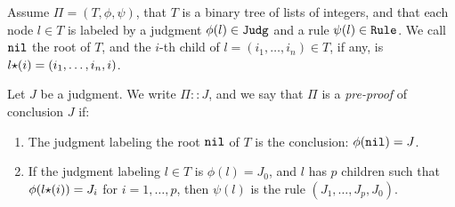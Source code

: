 

\begin{definition}
Assume $\Pi=(T,\phi, \psi)$, that $T$ is a binary tree of lists of integers, and 
that each node $l \in T$
is labeled by a judgment $\phi(l) \in {\tt Judg}$ and a rule $\psi(l) \in {\tt Rule}$. 
We call ${\tt nil}$ the root of $T$, and the $i$-th child of $l = ( i_1, \ldots, i_n ) \in T$, if any, 
is $l {\star} (i) = ( i_1, \ldots, i_n, i)$.

Let $J$ be a judgment. 
We write $\Pi :: J$, and we say that $\Pi$ is a \emph{pre-proof} of conclusion $J$ if:
\begin{enumerate}
\item 
  The judgment labeling the root ${\tt nil}$ of $T$ is the conclusion: $\phi({\tt nil}) = J$.
\item
  If the judgment labeling $l \in T$ is $\phi(l) = J_0$, and $l$ has $p$ children
  such that $\phi(l {\star} (i)) = J_i$ for $i=1, \ldots, p$,
  then $\psi(l)$ is the rule $(J_1,\ldots,J_p,J_0)$.
\end{enumerate}
\end{definition}

%
%


